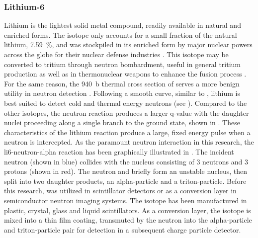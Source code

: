 \documentclass[../../../../main.tex]{subfiles}
\begin{document}
%
    \subsubsection{Lithium-6}%
    \label{sec:chapter-2:radiation-detection:neutron-interactions:lithium-6}%
    Lithium is the lightest solid metal compound, readily available in natural and enriched forms.
    The isotope  only accounts for a small fraction of the natural lithium, \SI{7.59}{\percent}, and was stockpiled in its enriched form by major nuclear powers across the globe for their nuclear defense industries \cite{Chadwick_2011}.
    This isotope may be converted to tritium through neutron bombardment, useful in general tritium production as well as in thermonuclear weapons to enhance the fusion process \cite{Kouzes_2009}.
    For the same reason, the \SI{940}{\barn} thermal cross section of  serves a more benign utility in neutron detection \cite{Chadwick_2011}.
    Following a smooth  curve, similar to , lithium is best suited to detect cold and thermal energy neutrons (see ).
    Compared to the other isotopes, the neutron reaction produces a larger \gls{q-value} with the daughter nuclei proceeding along a single branch to the ground state, shown in .
    These characteristics of the lithium reaction produce a large, fixed energy pulse when a neutron is intercepted.
    As the paramount neutron interaction in this research, the \gls{li6-neutron-alpha} reaction has been graphically illustrated in .
    The incident neutron (shown in blue) collides with the  nucleus consisting of 3 neutrons and 3 protons (shown in red).
    The neutron and  briefly form an unstable nucleus, then split into two daughter products, an \gls{alpha-particle} and a \gls{triton-particle}.
    Before this research,  was utilized in scintillator detectors or as a conversion layer in semiconductor neutron imaging systems.
    The isotope has been manufactured in plastic, crystal, glass and liquid scintillators.
    As a conversion layer, the isotope is mixed into a thin film coating, transmuted by the neutron into the \gls{alpha-particle} and \gls{triton-particle} pair for detection in a subsequent charge particle detector.
\end{document}
